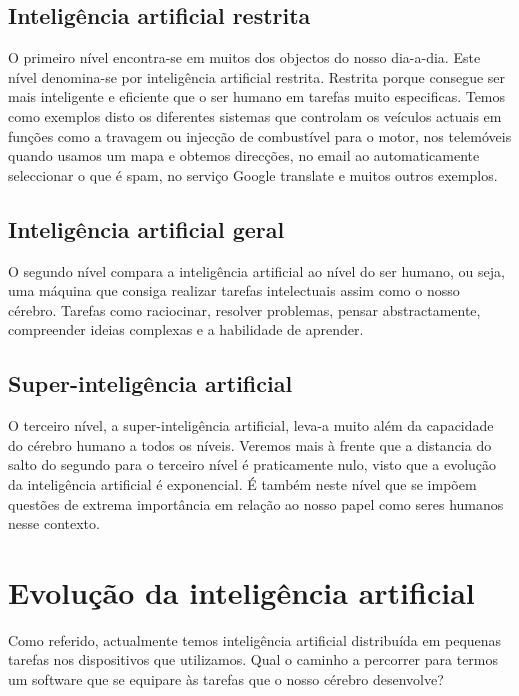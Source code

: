 \documentclass[runningheads,a4paper]{llncs}
\begin{document}
\subsection{Inteligência artificial restrita}
O primeiro nível encontra-se em muitos dos objectos do nosso dia-a-dia. Este nível denomina-se por inteligência artificial restrita. Restrita porque consegue ser mais inteligente e eficiente que o ser humano em tarefas muito especificas.
Temos como exemplos disto os diferentes sistemas que controlam os veículos actuais em funções como a travagem ou injecção de combustível para o motor, nos telemóveis quando usamos um mapa e obtemos direcções, no email ao automaticamente seleccionar o que é spam, no serviço Google translate e muitos outros exemplos.

\subsection{Inteligência artificial geral}
O segundo nível compara a inteligência artificial ao nível do ser humano, ou seja, uma máquina que consiga realizar tarefas intelectuais assim como o nosso cérebro. Tarefas como raciocinar, resolver problemas, pensar abstractamente, compreender ideias complexas e a habilidade de aprender.

\subsection{Super-inteligência artificial}
O terceiro nível, a super-inteligência artificial, leva-a muito além da capacidade do cérebro humano a todos os níveis. Veremos mais à frente que a distancia do salto do segundo para o terceiro nível é praticamente nulo, visto que a evolução da inteligência artificial é exponencial. É também neste nível que se impõem questões de extrema importância em relação ao nosso papel como seres humanos nesse contexto.

\section{Evolução da inteligência artificial}

Como referido, actualmente temos inteligência artificial distribuída em pequenas tarefas nos dispositivos que utilizamos. Qual o caminho a percorrer para termos um software que se equipare às tarefas que o nosso cérebro desenvolve?
\end{document}
